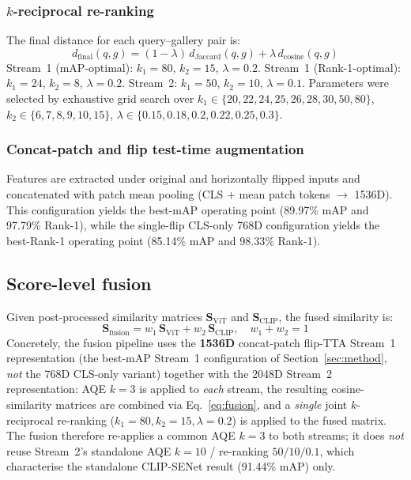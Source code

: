 \documentclass[10pt,a4paper]{article}
\begin{document}
\subsubsection{$k$-reciprocal re-ranking}
The final distance for each query--gallery pair is:
\begin{equation}
  d_{\mathrm{final}}(q,g) =
    (1{-}\lambda)\,d_{\mathrm{Jaccard}}(q,g)
    + \lambda\,d_{\mathrm{cosine}}(q,g)
  \label{eq:rerank}
\end{equation}
Stream~1 (mAP-optimal): $k_1{=}80$, $k_2{=}15$, $\lambda{=}0.2$. Stream~1
(Rank-1-optimal): $k_1{=}24$, $k_2{=}8$, $\lambda{=}0.2$. Stream~2:
$k_1{=}50$, $k_2{=}10$, $\lambda{=}0.1$. Parameters were selected by exhaustive
grid search over $k_1\in\{20,22,24,25,26,28,30,50,80\}$,
$k_2\in\{6,7,8,9,10,15\}$, $\lambda\in\{0.15,0.18,0.2,0.22,0.25,0.3\}$.

\subsubsection{Concat-patch and flip test-time augmentation}
Features are extracted under original and horizontally flipped inputs and
concatenated with patch mean pooling (CLS $+$ mean patch tokens
$\to$ 1536D). This configuration yields the best-mAP operating point (89.97\%
mAP and 97.79\% Rank-1), while the single-flip CLS-only 768D configuration
yields the best-Rank-1 operating point (85.14\% mAP and 98.33\% Rank-1).

\subsection{Score-level fusion}
Given post-processed similarity matrices $\mathbf{S}_{\mathrm{ViT}}$ and
$\mathbf{S}_{\mathrm{CLIP}}$, the fused similarity is:
\begin{equation}
  \mathbf{S}_{\mathrm{fusion}} =
    w_1\,\mathbf{S}_{\mathrm{ViT}} + w_2\,\mathbf{S}_{\mathrm{CLIP}},
  \quad w_1+w_2=1
  \label{eq:fusion}
\end{equation}
Concretely, the fusion pipeline uses the \textbf{1536D} concat-patch flip-TTA
Stream~1 representation (the best-mAP Stream~1 configuration of
Section~\ref{sec:method}, \emph{not} the 768D CLS-only variant) together with
the 2048D Stream~2 representation: AQE $k{=}3$ is applied to \emph{each}
stream, the resulting cosine-similarity matrices are combined via
Eq.~\eqref{eq:fusion}, and a \emph{single} joint $k$-reciprocal re-ranking
($k_1{=}80, k_2{=}15, \lambda{=}0.2$) is applied to the fused matrix. The
fusion therefore re-applies a common AQE $k{=}3$ to both streams; it does
\emph{not} reuse Stream~2's standalone AQE $k{=}10$ / re-ranking $50/10/0.1$,
which characterise the standalone CLIP-SENet result (91.44\% mAP) only.
\end{document}
